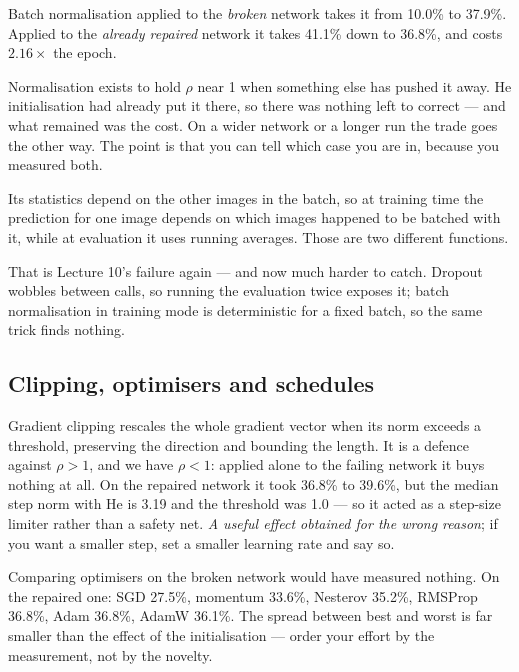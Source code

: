 \documentclass[11pt,a4paper]{article}
\begin{document}
\begin{keybox}[title={Why the repair everyone reaches for first did not pay}]
Batch normalisation applied to the \emph{broken} network takes it from 10.0\%
to 37.9\%. Applied to the \emph{already repaired} network it takes 41.1\% down
to 36.8\%, and costs $2.16\times$ the epoch.

Normalisation exists to hold $\rho$ near 1 when something else has pushed it
away. He initialisation had already put it there, so there was nothing left to
correct --- and what remained was the cost. On a wider network or a longer run
the trade goes the other way. The point is that you can tell which case you are
in, because you measured both.
\end{keybox}

\begin{failbox}[title={Failure condition --- the bill batch normalisation carries}]
Its statistics depend on the other images in the batch, so at training time the
prediction for one image depends on which images happened to be batched with
it, while at evaluation it uses running averages. Those are two different
functions.

That is Lecture 10's  failure again --- and now much harder
to catch. Dropout wobbles between calls, so running the evaluation twice
exposes it; batch normalisation in training mode is deterministic for a fixed
batch, so the same trick finds nothing.
\end{failbox}

\subsection{Clipping, optimisers and schedules}

Gradient clipping rescales the whole gradient vector when its norm exceeds a
threshold, preserving the direction and bounding the length. It is a defence
against $\rho > 1$, and we have $\rho < 1$: applied alone to the failing
network it buys nothing at all. On the repaired network it took 36.8\% to
39.6\%, but the median step norm with He is 3.19 and the threshold was 1.0 ---
so it acted as a step-size limiter rather than a safety net. \emph{A useful
effect obtained for the wrong reason}; if you want a smaller step, set a
smaller learning rate and say so.

Comparing optimisers on the broken network would have measured nothing. On the
repaired one: SGD 27.5\%, momentum 33.6\%, Nesterov 35.2\%, RMSProp 36.8\%,
Adam 36.8\%, AdamW 36.1\%. The spread between best and worst is far smaller
than the effect of the initialisation --- order your effort by the measurement,
not by the novelty.
\end{document}
